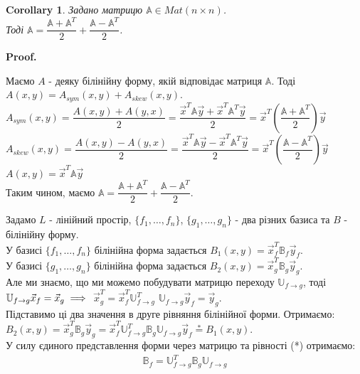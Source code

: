 \documentclass[a4paper, 10pt]{article}
\makeatletter
\def\qed{$\blacksquare$}
\theoremstyle{theoremdd}
\theoremstyle{theoremdd}
\theoremstyle{theoremdd}
\theoremstyle{theoremdd}
\theoremstyle{theoremdd}
\theoremstyle{theoremdd}
\theoremstyle{theoremdd}
\theoremstyle{theoremdd}
\newtheorem{corollary}[theorem]{Corollary}
\renewenvironment{proof}[1][Proof.\\]{\par
\pushQED{\hfill \qed}%
\normalfont \topsep6\p@\@plus6\p@\relax
\trivlist
\item\relax
{\bfseries
#1\@addpunct{.}}\hspace\labelsep\ignorespaces
}{%
\popQED\endtrivlist\@endpefalse
}
\makeatother
\begin{document}
\begin{corollary}
Задано матрицю $\mathbb{A} \in Mat (n \times n)$.\\
Тоді $\mathbb{A} = \dfrac{\mathbb{A} + \mathbb{A}^T}{2} + \dfrac{\mathbb{A} - \mathbb{A}^T}{2}$.
\end{corollary}

\begin{proof}
Маємо $A$ - деяку білінійну форму, якій відповідає матриця $\mathbb{A}$. Тоді $A(x,y) = A_{sym}(x,y) + A_{skew}(x,y)$.\\
$A_{sym}(x,y) = \dfrac{A(x,y) + A(y,x)}{2} = \dfrac{\vec{x}^T \mathbb{A} \vec{y} + \vec{x}^T \mathbb{A}^T \vec{y}}{2} = \vec{x}^T \left( \dfrac{\mathbb{A} + \mathbb{A}^T}{2} \right) \vec{y}$\\
$A_{skew}(x,y) = \dfrac{A(x,y) - A(y,x)}{2} = \dfrac{\vec{x}^T \mathbb{A} \vec{y} - \vec{x}^T \mathbb{A}^T \vec{y}}{2} = \vec{x}^T \left( \dfrac{\mathbb{A} - \mathbb{A}^T}{2} \right) \vec{y}$\\
$A(x,y) = \vec{x}^T \mathbb{A} \vec{y}$\\
Таким чином, маємо $\mathbb{A} = \dfrac{\mathbb{A} + \mathbb{A}^T}{2} + \dfrac{\mathbb{A} - \mathbb{A}^T}{2}$.
\end{proof}

Задамо $L$ - лінійний простір, $\{f_1,\dots,f_n\}$, $\{g_1,\dots,g_n\}$ - два різних базиса та $B$ - білінійну форму.\\
У базисі $\{f_1,\dots,f_n\}$ білінійна форма задається $B_1(x,y) = \vec{x}^T_f \mathbb{B}_f \vec{y}_f$.\\
У базисі $\{g_1,\dots,g_n\}$ білінійна форма задається $B_2(x,y) = \vec{x}^T_g \mathbb{B}_g \vec{y}_g$.\\
Але ми знаємо, що ми можемо побудувати матрицю переходу $\mathbb{U}_{f \to g}$, тоді $\mathbb{U}_{f \to g} \vec{x}_f = \vec{x}_g \implies \\ $ 
$\vec{x}_g^T = \vec{x}_f^T \mathbb{U}_{f \to g}^T$ \hspace{1cm} $\mathbb{U}_{f \to g} \vec{y}_f = \vec{y}_g$.\\
Підставимо ці два значення в друге рівняння білінійної форми. Отримаємо:\\
$B_2(x,y) = \vec{x}_g^T \mathbb{B}_g \vec{y}_g = \vec{x}_f^T \mathbb{U}^T_{f \to g} \mathbb{B}_g \mathbb{U}_{f \to g} \vec{y}_f \overset{*}{=} B_1(x,y)$.\\
У силу єдиного представлення форми через матрицю та рівності (*) отримаємо:
\begin{align*}
\mathbb{B}_f = \mathbb{U}^T_{f \to g} \mathbb{B}_g \mathbb{U}_{f \to g}
\end{align*}
\end{document}
